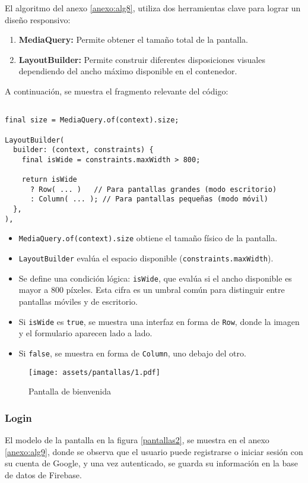El algoritmo del anexo \ref{anexo:alg8}, utiliza dos herramientas clave para lograr un diseño responsivo:

\begin{enumerate}
    \item \textbf{MediaQuery:} Permite obtener el tamaño total de la pantalla.
    \item \textbf{LayoutBuilder:} Permite construir diferentes disposiciones visuales dependiendo del ancho máximo disponible en el contenedor.
\end{enumerate}

A continuación, se muestra el fragmento relevante del código:

\begin{verbatim}

final size = MediaQuery.of(context).size;

LayoutBuilder(
  builder: (context, constraints) {
    final isWide = constraints.maxWidth > 800;

    return isWide
      ? Row( ... )   // Para pantallas grandes (modo escritorio)
      : Column( ... ); // Para pantallas pequeñas (modo móvil)
  },
),
\end{verbatim}



\begin{itemize}
    \item \texttt{MediaQuery.of(context).size} obtiene el tamaño físico de la pantalla.
    \item \texttt{LayoutBuilder} evalúa el espacio disponible (\texttt{constraints.maxWidth}).
    \item Se define una condición lógica: \texttt{isWide}, que evalúa si el ancho disponible es mayor a 800 píxeles. Esta cifra es un umbral común para distinguir entre pantallas móviles y de escritorio.
    \item Si \texttt{isWide} es \texttt{true}, se muestra una interfaz en forma de \texttt{Row}, donde la imagen y el formulario aparecen lado a lado.
    \item Si \texttt{false}, se muestra en forma de \texttt{Column}, uno debajo del otro.
\end{itemize}

\begin{figure}[h!]
\centering
  \texttt{[image: assets/pantallas/1.pdf]}
  \caption{Pantalla de bienvenida}
  \label{pantallas1}
\end{figure}

\newpage
\subsubsection*{Login}
El modelo de la pantalla en la figura \ref{pantallas2}, se muestra en el anexo \ref{anexo:alg9}, donde se observa que el usuario puede registrarse o iniciar sesión con su cuenta de Google, y una vez autenticado, se guarda su información en la base de datos de Firebase.


